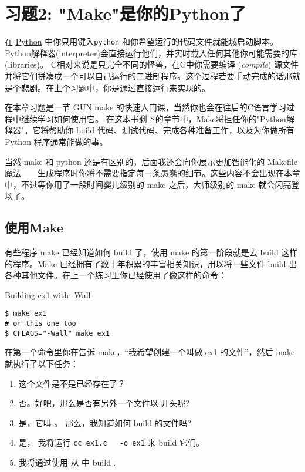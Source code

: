 \chapter{习题2: "Make"是你的Python了}

在 \href{http://learnpythonthehardway.org}{Python} 中你只用键入\verb|python| 和你希望运行的代码文件就能城启动脚本。Python解释器(interpreter)会直接运行他们，并实时载入任何其他你可能需要的库(libraries)。 C相对来说是只完全不同的怪兽，在C中你需要编译 (\emph{compile}) 源文件并将它们拼凑成一个可以自己运行的二进制程序。这个过程若要手动完成的话那就是个悲剧。在上个习题中，你是通过直接运行来实现的。

在本章习题是一节 GUN make 的快速入门课，当然你也会在往后的C语言学习过程中继续学习如何使用它。 在这本书剩下的章节中，Make将担任你的"Python解释器"。它将帮助你 build 代码、测试代码、完成各种准备工作，以及为你做所有 Python 程序通常能做的事。

当然 make 和 python 还是有区别的，后面我还会向你展示更加智能化的 Makefile 魔法——生成程序时你将不需要指定每一条愚蠢的细节。这些内容不会出现在本章中，不过等你用了一段时间婴儿级别的 make 之后，大师级别的 make 就会闪亮登场了。


\section{使用Make}

有些程序 make 已经知道如何 build 了，使用 make 的第一阶段就是去 build 这样的程序。Make 已经拥有了数十年积累的丰富相关知识，用以将一些文件 build 出各种其他文件。在上一个练习里你已经使用了像这样的命令：

\begin{Terminal}{Building ex1 with -Wall}
\begin{lstlisting}
$ make ex1
# or this one too
$ CFLAGS="-Wall" make ex1
\end{lstlisting}
\end{Terminal}

在第一个命令里你在告诉 make，“我希望创建一个叫做 ex1 的文件”，然后 make 就执行了以下任务：

\begin{enumerate}
\item {} 这个文件是不是已经存在了？
\item 否。好吧，那么是否有另外一个文件以  开头呢?
\item 是，它叫 。 那么，我知道如何 build  的文件吗?
\item 是， 我将运行 \verb|cc ex1.c   -o ex1| 来 build 它们。
\item 我将通过使用  从  中 build .
\end{enumerate}

